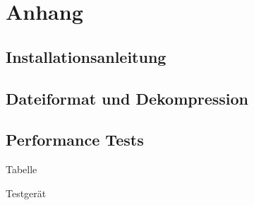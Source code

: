 \section{Anhang}
\subsection{Installationsanleitung}
\subsection{Dateiformat und Dekompression}
\subsection{Performance Tests} \label{anhang:performance}
Tabelle

Testgerät
